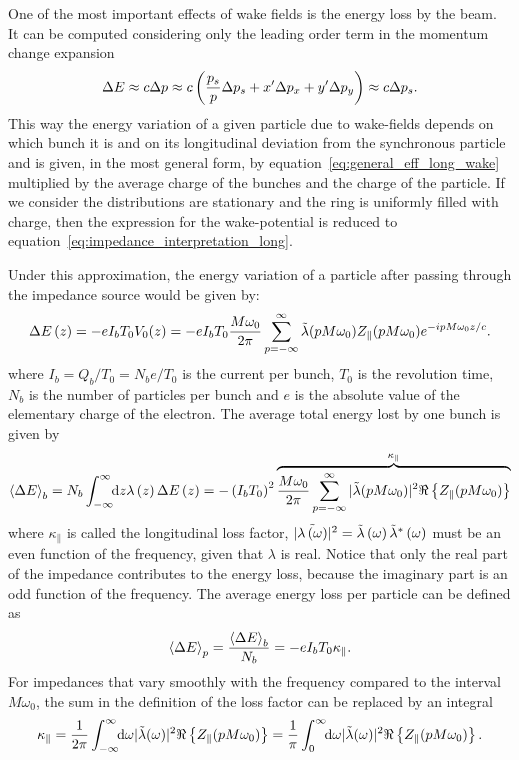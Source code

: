     One of the most important effects of wake fields is the energy loss by the beam. It can be computed considering only the leading order term in the momentum change expansion
    \begin{align}
        \Delta E \approx c\Delta p \approx c\fof{\frac{p_s}{p}\Delta p_s + x'\Delta p_x + y'\Delta p_y} \approx c\Delta p_s.
    \end{align}
    This way the energy variation of a given particle due to wake-fields depends on which bunch it is and on its longitudinal deviation from the synchronous particle and is given, in the most general form, by equation~\eqref{eq:general_eff_long_wake} multiplied by the average charge of the bunches and the charge of the particle. If we consider the distributions are stationary and the ring is uniformly filled with charge, then the expression for the wake-potential is reduced to equation~\eqref{eq:impedance_interpretation_long}.

    Under this approximation, the energy variation of a particle after passing through the impedance source would be given by:
    \begin{align}\label{eq:part_energy_loss}
	  	\Delta E\fof{z} = -eI_bT_0V_0(z) = -eI_bT_0\frac{M\omega_0}{2\pi} \sum_{p=-\infty}^\infty \fourier{\lambda}(pM\omega_0)Z_\parallel(pM\omega_0)e^{-ipM\omega_0 z/c}.
    \end{align}
    where $I_b=Q_b/T_0=N_be/T_0$ is the current per bunch, $T_0$ is the revolution time, $N_b$ is the number of particles per bunch and $e$ is the absolute value of the elementary charge of the electron. The average total energy lost by one bunch is given by
    \begin{align}\label{eq:energy_loss_bunch}
        \average[b]{\Delta E} = N_b\infint{z}{\lambda\fof{z}\Delta E\fof{z}} = -\fof{I_bT_0}^2\overbrace{\frac{M\omega_0}{2\pi} \sum_{p=-\infty}^\infty |\fourier{\lambda}(pM\omega_0)|^2\real{Z_\parallel(pM\omega_0)}}^{\kappa_\parallel}
    \end{align}
    where $\kappa_\parallel$ is called the longitudinal loss factor, $|\fourier{\lambda\fof{\omega}}|^2 = \fourier{\lambda}\fof{\omega}\fourier{\lambda}^*\fof{\omega}$ must be an even function of the frequency, given that $\lambda$ is real. Notice that only the real part of the impedance contributes to the energy loss, because the imaginary part is an odd function of the frequency. The average energy loss per particle can be defined as
    \begin{align}
        \average[p]{\Delta E} = \frac{\average[b]{\Delta E}}{N_b} = -eI_bT_0\kappa_\parallel.
    \end{align}
    For impedances that vary smoothly with the frequency compared to the interval $M\omega_0$, the sum in the definition of the loss factor can be replaced by an integral
    \begin{align}
        \kappa_\parallel =
            \frac{1}{2\pi} \infint{\omega}|\fourier{\lambda}(\omega)|^2\real{Z_\parallel(pM\omega_0)} =
            \frac1\pi \defint{\omega}{|\fourier{\lambda}(\omega)|^2\real{Z_\parallel(pM\omega_0)}}{0}{\infty}.
    \end{align}

